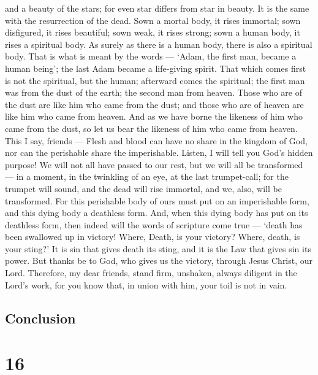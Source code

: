 and a beauty of the stars; for even star differs from star in beauty.
 It is the same with the resurrection of the dead. Sown a
mortal body, it rises immortal; sown disfigured, it rises beautiful;
 sown weak, it rises strong; sown a human body, it rises a
spiritual body.  As surely as there is a human body, there
is also a spiritual body.  That is what is meant by the
words --- `Adam, the first man, became a human being'; the last Adam
became a life-giving spirit.  That which comes first is not
the spiritual, but the human; afterward comes the spiritual;
 the first man was from the dust of the earth; the second
man from heaven.  Those who are of the dust are like him
who came from the dust; and those who are of heaven are like him who
came from heaven.  And as we have borne the likeness of him
who came from the dust, so let us bear the likeness of him who came from
heaven.  This I say, friends --- Flesh and blood can have
no share in the kingdom of God, nor can the perishable share the
imperishable.  Listen, I will tell you God's hidden
purpose! We will not all have passed to our rest, but we will all be
transformed --- in a moment, in the twinkling of an eye, 
at the last trumpet-call; for the trumpet will sound, and the dead will
rise immortal, and we, also, will be transformed.  For this
perishable body of ours must put on an imperishable form, and this dying
body a deathless form.  And, when this dying body has put
on its deathless form, then indeed will the words of scripture come true
---  `death has been swallowed up in victory! Where, Death,
is your victory? Where, death, is your sting?'  It is sin
that gives death its sting, and it is the Law that gives sin its power.
 But thanks be to God, who gives us the victory, through
Jesus Christ, our Lord.  Therefore, my dear friends, stand
firm, unshaken, always diligent in the Lord's work, for you know that,
in union with him, your toil is not in vain.

\hypertarget{conclusion}{%
\subsection{Conclusion}\label{conclusion}}

\hypertarget{section-15}{%
\section{16}\label{section-15}}

